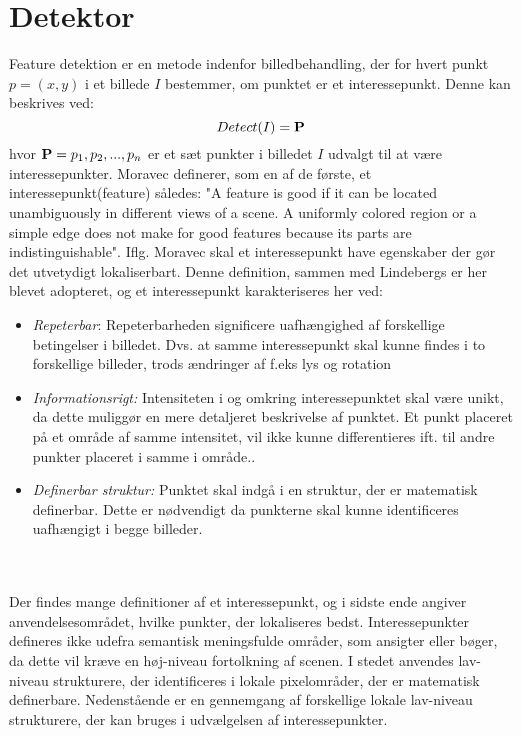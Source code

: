 \section{Detektor}\label{sec:detect}
Feature detektion er en metode indenfor billedbehandling, der for hvert punkt $p = (x,y)$ i et billede $I$ bestemmer, om punktet er et interessepunkt. Denne kan beskrives ved:
\begin{equation}
Detect(I)= \bold{P}
\label{detect}
\end{equation}
hvor $\bold{P} = {p_1, p_2,..., p_n}$ er et sæt punkter i billedet $I$ udvalgt til at være interessepunkter. Moravec \cite{moravec} definerer, som en af de første, et interessepunkt(feature) således: "A
feature is good if it can be located unambiguously in different views of a scene. A
uniformly colored region or a simple edge does not make for good features because
its parts are indistinguishable". Iflg. Moravec skal et interessepunkt have egenskaber der gør det utvetydigt lokaliserbart. Denne definition, sammen med Lindebergs \cite{pointsurvey} er her blevet adopteret, og et interessepunkt karakteriseres her ved:
\begin{itemize}
\item{\emph{Repeterbar}: Repeterbarheden significere uafhængighed af forskellige betingelser i billedet. Dvs. at samme interessepunkt skal kunne findes i to forskellige billeder, trods ændringer af f.eks lys og rotation}
\item{\emph{Informationsrigt:}
Intensiteten i og omkring interessepunktet skal være unikt, da dette muliggør en mere detaljeret beskrivelse af punktet. Et punkt placeret på et område af samme intensitet, vil ikke kunne differentieres ift. til andre punkter placeret i samme i område..}
\item{\textit{Definerbar struktur:} Punktet skal indgå i en struktur, der er matematisk definerbar. Dette er nødvendigt da punkterne skal kunne identificeres uafhængigt i begge billeder.}
\end{itemize}
\raggedbottom \\ \\
Der findes mange definitioner af et interessepunkt, og i sidste ende angiver anvendelsesområdet, hvilke punkter, der lokaliseres bedst.
Interessepunkter defineres ikke udefra semantisk meningsfulde områder, som ansigter eller bøger, da dette vil kræve en høj-niveau fortolkning af scenen. I stedet anvendes lav-niveau strukturere, der identificeres i lokale pixelområder, der er matematisk definerbare. Nedenstående er en gennemgang af forskellige lokale lav-niveau strukturere, der kan bruges i udvælgelsen af interessepunkter.

